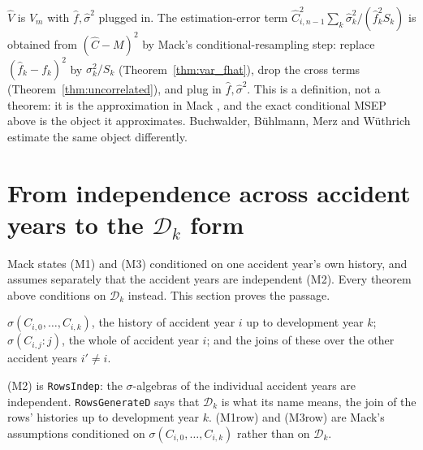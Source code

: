 \begin{definition}\label{def:mackEst}\leanok
{}
$\widehat{V}$ is $V_m$ with $\hat f, \hat\sigma^2$ plugged in. The estimation-error term
$\hat C_{i,n-1}^2 \sum_k \hat\sigma_k^2/(\hat f_k^2 S_k)$ is obtained from $(\hat C - M)^2$ by
Mack's conditional-resampling step: replace $(\hat f_k - f_k)^2$ by $\sigma_k^2/S_k$
(Theorem~\ref{thm:var_fhat}), drop the cross terms (Theorem~\ref{thm:uncorrelated}), and plug in
$\hat f, \hat\sigma^2$. This is a definition, not a theorem: it is the approximation in Mack
\cite{Mack1993}, and the exact conditional MSEP above is the object it approximates. Buchwalder,
Bühlmann, Merz and Wüthrich \cite{BBMW2006} estimate the same object differently.
\end{definition}

\section{From independence across accident years to the $\mathcal{D}_k$ form}

Mack states (M1) and (M3) conditioned on one accident year's own history, and assumes separately
that the accident years are independent (M2). Every theorem above conditions on $\mathcal{D}_k$
instead. This section proves the passage.

\begin{definition}\label{def:rowSigma}\leanok
{}
$\sigma(C_{i,0},\dots,C_{i,k})$, the history of accident year $i$ up to development year $k$;
$\sigma(C_{i,j} : j)$, the whole of accident year $i$; and the joins of these over the other
accident years $i' \neq i$.
\end{definition}

\begin{definition}\label{def:rowAssumptions}\leanok
{}
(M2) is \texttt{RowsIndep}: the $\sigma$-algebras of the individual accident years are independent.
\texttt{RowsGenerateD} says that $\mathcal{D}_k$ is what its name means, the join of the rows' histories
up to development year $k$. (M1row) and (M3row) are Mack's assumptions conditioned on
$\sigma(C_{i,0},\dots,C_{i,k})$ rather than on $\mathcal{D}_k$.
\end{definition}

